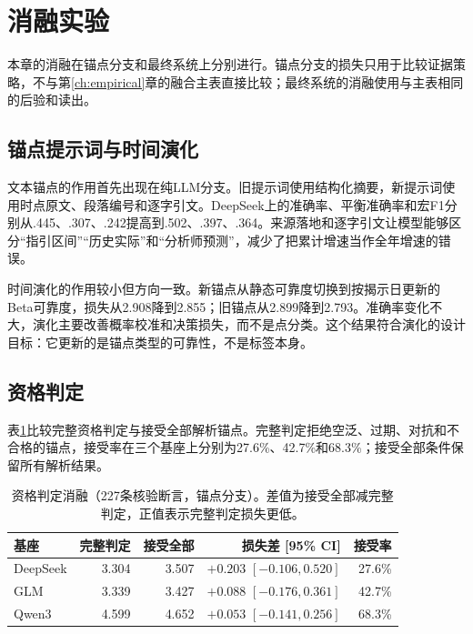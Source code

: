 \section{消融实验}

本章的消融在锚点分支和最终系统上分别进行。锚点分支的损失只用于比较证据策略，不与第\ref{ch:empirical}章的融合主表直接比较；最终系统的消融使用与主表相同的后验和读出。

\subsection{锚点提示词与时间演化}

文本锚点的作用首先出现在纯LLM分支。旧提示词使用结构化摘要，新提示词使用时点原文、段落编号和逐字引文。DeepSeek上的准确率、平衡准确率和宏F1分别从.445、.307、.242提高到.502、.397、.364。来源落地和逐字引文让模型能够区分“指引区间”“历史实际”和“分析师预测”，减少了把累计增速当作全年增速的错误。

时间演化的作用较小但方向一致。新锚点从静态可靠度切换到按揭示日更新的Beta可靠度，损失从2.908降到2.855；旧锚点从2.899降到2.793。准确率变化不大，演化主要改善概率校准和决策损失，而不是点分类。这个结果符合演化的设计目标：它更新的是锚点类型的可靠性，不是标签本身。

\subsection{资格判定}

表\ref{tab:qual-ablation}比较完整资格判定与接受全部解析锚点。完整判定拒绝空泛、过期、对抗和不合格的锚点，接受率在三个基座上分别为27.6\%、42.7\%和68.3\%；接受全部条件保留所有解析结果。

\begin{table}[htbp]
\centering
{}
\setlength{\tabcolsep}{4pt}
\caption{资格判定消融（227条核验断言，锚点分支）。差值为接受全部减完整判定，正值表示完整判定损失更低。}
\label{tab:qual-ablation}
\begin{tabular}{lrrrr}
\toprule
基座 & 完整判定 & 接受全部 & 损失差 [95\% CI] & 接受率 \\
\midrule
DeepSeek & 3.304 & 3.507 & $+0.203$ $[-0.106,0.520]$ & 27.6\% \\
GLM & 3.339 & 3.427 & $+0.088$ $[-0.176,0.361]$ & 42.7\% \\
Qwen3 & 4.599 & 4.652 & $+0.053$ $[-0.141,0.256]$ & 68.3\% \\
\bottomrule
\end{tabular}
\end{table}


